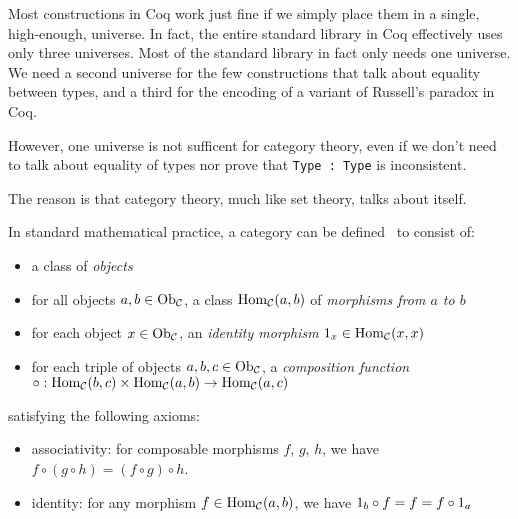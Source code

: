 Most constructions in Coq work just fine if we simply place them in a single, high-enough, universe.
In fact, the entire standard library in Coq effectively uses only three universes.
Most of the standard library in fact only needs one universe.
We need a second universe for the few constructions that talk about equality between types, and a third for the encoding of a variant of Russell's paradox in Coq.

However, one universe is not sufficent for category theory, even if we don't need to talk about equality of types nor prove that \texttt{Type : Type} is inconsistent.

The reason is that category theory, much like set theory, talks about itself.

In standard mathematical practice, a category  can be defined~\cite{awodey2010category} to consist of:
\begin{itemize}
  \item
    a class \Ob[C] of \emph{objects}
  \item
    for all objects $a, b \in \Ob[C]$, a class $\Hom[C](a, b)$ of \emph{morphisms from $a$ to $b$}
  \item
    for each object $x \in \Ob[C]$, an \emph{identity morphism} $\Id[x] \in \Hom[C](x, x)$
  \item
    for each triple of objects $a, b, c \in \Ob[C]$, a \emph{composition function} $\circ : \Hom[C](b, c) \times \Hom[C](a, b) \to \Hom[C](a, c)$
\end{itemize}
satisfying the following axioms:
\begin{itemize}
  \item
    associativity: for composable morphisms $f$, $g$, $h$, we have $f \circ (g \circ h) = (f \circ g) \circ h$.
  \item
    identity: for any morphism $f \in \Hom[C](a, b)$, we have $\Id[b] \circ f = f = f \circ \Id[a]$
\end{itemize}

